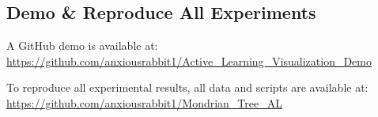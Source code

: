 \documentclass{article}
\begin{document}
\subsection{Demo \& Reproduce All Experiments}

A GitHub demo is available at: \url{https://github.com/anxiousrabbit1/Active_Learning_Visualization_Demo}

To reproduce all experimental results, all data and scripts are available at: \url{https://github.com/anxiousrabbit1/Mondrian_Tree_AL}
\end{document}
